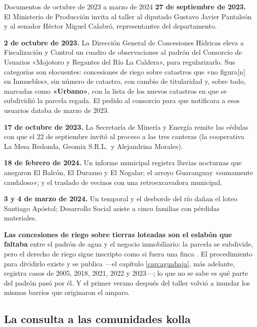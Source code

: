 \begin{ficha}{Documentos de octubre de 2023 a marzo de 2024}
\textbf{27 de septiembre de 2023.} El Ministerio de Producción invita al taller al diputado Gustavo Javier Pantaleón y al senador Héctor Miguel Calabró, representantes del departamento.

\textbf{2 de octubre de 2023.} La Dirección General de Concesiones Hídricas eleva a Fiscalización y Control un cuadro de observaciones al padrón del Consorcio de Usuarios «Mojotoro y Regantes del Río La Caldera», para regularizarlo. Sus categorías son elocuentes: concesiones de riego sobre catastros que «no figura[n] en Inmuebles», sin número de catastro, con cambio de titularidad y, sobre todo, marcadas como \textbf{«Urbano»}, con la lista de los nuevos catastros en que se subdividió la parcela regada. El pedido al consorcio para que notificara a esos usuarios databa de marzo de 2023.

\textbf{17 de octubre de 2023.} La Secretaría de Minería y Energía remite las cédulas con que el 22 de septiembre invitó al proceso a las tres canteras (la cooperativa La Mesa Redonda, Geomix S.R.L.\ y Alejandrina Morales).

\textbf{18 de febrero de 2024.} Un informe municipal registra lluvias nocturnas que anegaron El Balcón, El Durazno y El Nogalar; el arroyo Guaranguay «sumamente caudaloso»; y el traslado de vecinos con una retroexcavadora municipal.

\textbf{3 y 4 de marzo de 2024.} Un temporal y el desborde del río dañan el loteo Santiago Apóstol; Desarrollo Social asiste a cinco familias con pérdidas materiales.
\end{ficha}

\textbf{Las concesiones de riego sobre tierras loteadas son el eslabón que faltaba} entre el padrón de agua y el negocio inmobiliario: la parcela se subdivide, pero el derecho de riego sigue inscripto como si fuera una finca . El procedimiento para dividirlo existe y se publica ---el capítulo \ref{cap:aguabaja}, más adelante, registra casos de 2005, 2018, 2021, 2022 y 2023---; lo que no se sabe es qué parte del padrón pasó por él. Y el primer verano después del taller volvió a inundar los mismos barrios que originaron el amparo.

\subsection*{La consulta a las comunidades kolla}

